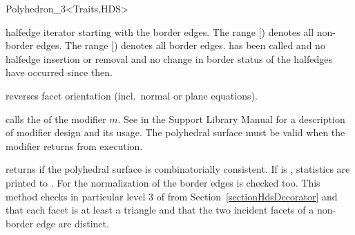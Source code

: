 \begin{ccClassTemplate}{Polyhedron_3<Traits,HDS>}
\begin{ccAdvanced}
    {halfedge iterator starting with the border edges. The range
      [) denotes
    all non-border edges. The range
    [) denotes all
    border edges.
    \ccPrecond {} has been called and no
    halfedge insertion or removal and no change in border
    status of the halfedges have occurred since then.}

\end{ccAdvanced}


    {reverses facet orientation (incl.\ normal or plane equations).}

\begin{ccAdvanced}
    {calls the  of the modifier $m$. See
     in the Support Library Manual for a
    description of modifier design and its usage.
    \ccPrecond The polyhedral surface must be valid when the modifier
    returns from execution.}
\end{ccAdvanced}

   {returns  if the polyhedral surface is combinatorially 
    consistent. If  is , statistics are
    printed to . For  the normalization of the
    border edges is checked too. This method checks in particular level 3 of
     from
    Section~\ref{sectionHdsDecorator} and that each facet is at least
    a triangle and that the two incident facets of a non-border edge are
    distinct.}


\begin{ccAdvanced}


\end{ccAdvanced}
\end{ccClassTemplate}
